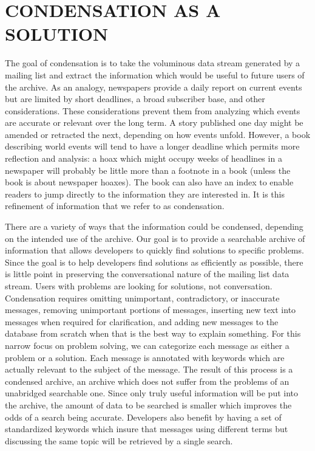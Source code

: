 \section{CONDENSATION AS A SOLUTION}
The goal of condensation is to take the voluminous data stream generated by a
mailing list and extract the information which would be useful to future users
of the archive.  As an analogy, newspapers provide a daily report on current
events but are limited by short deadlines, a broad subscriber base, and other
considerations. These considerations prevent them from analyzing which events
are accurate or relevant over the long term. A story published one day might be
amended or retracted the next, depending on how events unfold. However, a book
describing world events will tend to have a longer deadline which permits more
reflection and analysis: a hoax which might occupy weeks of headlines in a
newspaper will probably be little more than a footnote in a book (unless the
book is about newspaper hoaxes). The book can also have an index to enable
readers to jump directly to the information they are interested in. It is this
refinement of information that we refer to as condensation.

There are a variety of ways that the information could be condensed, depending
on the intended use of the archive. Our goal is to provide a searchable archive
of information that allows developers to quickly find solutions to specific
problems. Since the goal is to help developers find solutions as efficiently as
possible, there is little point in preserving the conversational nature of the
mailing list data stream. Users with problems are looking for solutions, not
conversation. Condensation requires omitting unimportant, contradictory, or
inaccurate messages, removing unimportant portions of messages, inserting new
text into messages when required for clarification, and adding new messages to
the database from scratch when that is the best way to explain something. For
this narrow focus on problem solving, we can categorize each message as either
a problem or a solution. Each message is annotated with keywords which are
actually relevant to the subject of the message. The result of this process is
a condensed archive, an archive which does not suffer from the problems of an
unabridged searchable one.  Since only truly useful information will be put
into the archive, the amount of data to be searched is smaller which improves
the odds of a search being accurate. Developers also benefit by having a set of
standardized keywords which insure that messages using different terms but
discussing the same topic will be retrieved by a single search.


